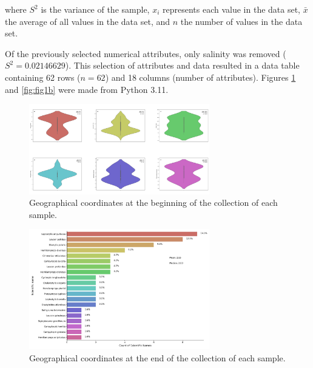 where \( S^2 \) is the variance of the sample, \( x_i \) represents each value in the data set, \( \bar{x} \) the average of all values in the data set, and \( n \) the number of values in the data set.

Of the previously selected numerical attributes, only salinity was removed (\( S^2 = 0.02146629 \)). This selection of attributes and data resulted in a data table containing 62 rows (\( n=62 \)) and 18 columns (number of attributes). Figures \ref{fig:fig1a} and \ref{fig:fig1b} were made from Python 3.11.

\begin{figure}[]
    \centering
    \includegraphics[width=0.7\textwidth]{figure1.jpg}
    \caption{Geographical coordinates at the beginning of the collection of each sample. \label{fig:fig1a}}
\end{figure}

\begin{figure}[]
    \centering
    \includegraphics[width=0.7\textwidth]{figure2.jpg}
    \caption{Geographical coordinates at the end of the collection of each sample. \label{fig:fig2}}
\end{figure}

